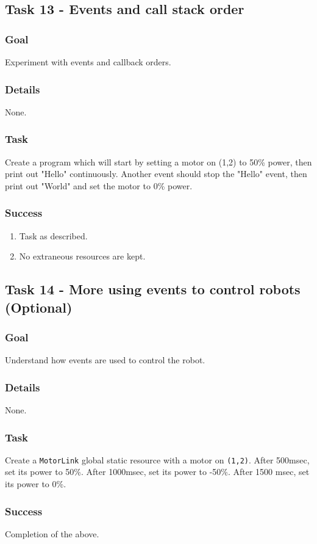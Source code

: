 \documentclass[a4paper]{article}
\begin{document}
\subsection{Task 13 - Events and call stack order}
\subsubsection{Goal} Experiment with events and callback orders.
\subsubsection{Details} None.
\subsubsection{Task} Create a program which will start by setting a motor on (1,2) to 50\% power, then print out "Hello" continuously. Another event should stop the "Hello" event, then print out "World" and set the motor to 0\% power.
\subsubsection{Success} \begin{enumerate}\item{Task as described.}\item{No extraneous resources are kept.}\end{enumerate}

\subsection{Task 14 - More using events to control robots (Optional)}
\subsubsection{Goal} Understand how events are used to control the robot.
\subsubsection{Details} None.
\subsubsection{Task} Create a \lstinline{MotorLink} global static resource with a motor on \lstinline{(1,2)}. After 500msec, set its power to 50\%. After 1000msec, set its power to -50\%. After 1500 msec, set its power to 0\%. 
\subsubsection{Success} Completion of the above.
\end{document}
